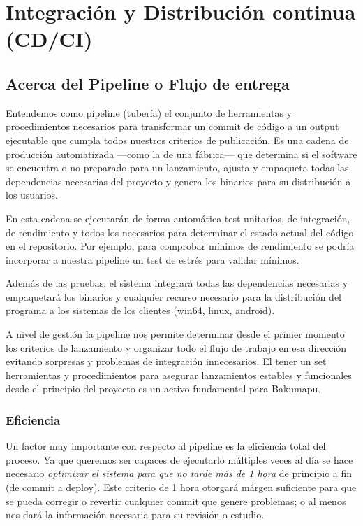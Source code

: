 
\section{Integración y Distribución continua (CD/CI)}\label{pipeline:entrega-continua}

\subsection{Acerca del Pipeline o Flujo de entrega}\label{pipeline:acerca-del-pipeline}

Entendemos como pipeline (tubería) el conjunto de herramientas y procedimientos necesarios para transformar un commit de código a un output ejecutable que cumpla todos nuestros criterios de publicación. Es una cadena de producción automatizada ---como la de una fábrica--- que determina si el software se encuentra o no preparado para un lanzamiento, ajusta y empaqueta todas las dependencias necesarias del proyecto y genera los binarios para su distribución a los usuarios.

En esta cadena se ejecutarán de forma automática test unitarios, de integración, de rendimiento y todos los necesarios para determinar el estado actual del código en el repositorio. Por ejemplo, para comprobar mínimos de rendimiento se podría incorporar a nuestra pipeline un test de estrés para validar  mínimos.

Además de las pruebas, el sistema integrará todas las dependencias necesarias y empaquetará los binarios y cualquier recurso necesario para la distribución del programa a los sistemas de los clientes (win64, linux, android).

A nivel de gestión la pipeline nos permite determinar desde el primer momento los criterios de lanzamiento y organizar todo el flujo de trabajo en esa dirección evitando sorpresas y problemas de integración innecesarios. El tener un set herramientas y procedimientos para asegurar lanzamientos estables y funcionales desde el principio del proyecto es un activo fundamental para Bakumapu.

\subsubsection{Eficiencia}\label{pipeline:eficiencia}

Un factor muy importante con respecto al pipeline es la eficiencia total del proceso. Ya que queremos ser capaces de ejecutarlo múltiples veces al día se hace necesario \emph{optimizar el sistema para que no tarde más de 1 hora} de principio a fin (de commit a deploy). Este criterio de 1 hora otorgará márgen suficiente para que se pueda corregir o revertir cualquier commit que genere problemas; o al menos nos dará la información necesaria para su revisión o estudio.

